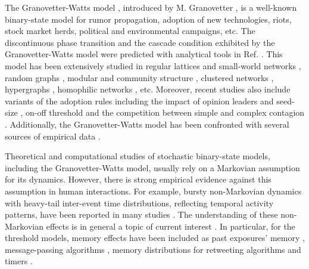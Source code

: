 The Granovetter-Watts model \cite{watts-2002}, introduced by M. Granovetter \cite{granovetter-1978}, is a well-known binary-state model for rumor propagation, adoption of new technologies, riots, stock market herds, political and environmental campaigns, etc. %
The discontinuous phase transition and the cascade condition exhibited by the Granovetter-Watts model were predicted with analytical tools in Ref. \cite{watts-2002}. This model has been extensively studied in regular lattices and small-world networks \cite{centola-2007}, random graphs \cite{gleeson-2007},  modular and community structure \cite{gleeson-2008}, clustered networks \cite{hackett-2011,hackett-2013}, hypergraphs \cite{de-arruda-2020}, homophilic networks \cite{diaz-diaz-2022}, etc. Moreover, recent studies also include variants of the adoption rules including
the impact of opinion leaders \cite{liu-2018} and seed-size \cite{singh-2013}, on-off threshold \cite{dodds-2013} and the competition between simple and complex contagion \cite{czaplicka-2016,min-2018,diaz-diaz-2022}. Additionally, the Granovetter-Watts model has been confronted with several sources of empirical data \cite{centola-2010,karimi-2013,karsai-2014,rosenthal-2015,karsai-2016,mnsted-2017,unicomb-2018,guilbeault-2021}.


Theoretical and computational studies of stochastic binary-state models, including the Granovetter-Watts model, usually rely on a Markovian assumption for its dynamics. 
However, there is strong empirical evidence against this assumption in human interactions.  For example, bursty non-Markovian dynamics with heavy-tail inter-event time distributions, reflecting temporal activity patterns,  have been reported in many studies \cite{iribarren-2009,karsai-2011,rybski-2012,zignani-2016,artime-2017,kumar-2020}. The understanding of these non-Markovian effects is in general a topic of current interest \cite{van-mieghem-2013,starnini-2017,peralta-2020C,peralta-2020A}. In particular, for the threshold models, memory effects have been included as past exposures' memory \cite{dodds-2004}, message-passing algorithms \cite{shrestha-2014}, memory distributions for retweeting algorithms \cite{gleeson-2016} and timers \cite{oh-2018}.

